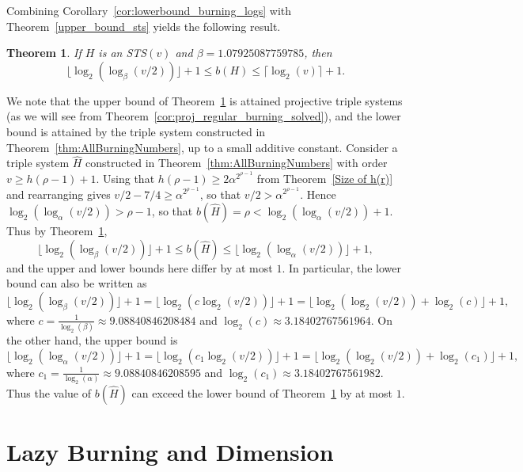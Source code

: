 \documentclass[12pt]{article}
\newtheorem{theorem}{Theorem}[section]
\theoremstyle{definition}
\numberwithin{table}{section}
\begin{document}
Combining Corollary~\ref{cor:lowerbound_burning_logs} with Theorem~\ref{upper_bound_sts} yields the following result. 

\begin{theorem}
\label{thm:ConfinedBurningNumber}
If $H$ is an STS$(v)$ and $\beta = 1.07925087759785$, then
\[\lfloor \log_2(\log_\beta(v/2))\rfloor +1\leq b(H)\leq   \lceil \log_2(v)\rceil+1.\]
\end{theorem}

We note that the upper bound of Theorem~\ref{thm:ConfinedBurningNumber} is attained projective triple systems (as we will see from Theorem~\ref{cor:proj_regular_burning_solved}), and the lower bound is attained by the triple system constructed in Theorem~\ref{thm:AllBurningNumbers}, up to a small additive constant. 
Consider a triple system $\widehat{H}$ constructed in Theorem~\ref{thm:AllBurningNumbers} with order $v \geq h(\rho-1)+1$.  Using that $h(\rho-1) \geq 2 \alpha^{2^{\rho-1}}$ from Theorem~\ref{Size of h(r)} and rearranging gives $v/2-7/4 \geq \alpha^{2^{\rho-1}}$, so that $v/2 > \alpha^{2^{\rho-1}}$.  Hence $\log_2(\log_{\alpha}(v/2)) > \rho-1$, so that $b(\widehat{H}) = \rho < \log_2(\log_{\alpha} (v/2)) + 1$.  Thus by Theorem~\ref{thm:ConfinedBurningNumber}, 
\[
\lfloor \log_2(\log_{\beta}(v/2))\rfloor+1 \leq b(\widehat{H}) \leq \lfloor\log_2(\log_{\alpha} (v/2))\rfloor + 1,
\]
and the upper and lower bounds here differ by at most $1$.
In particular, the lower bound can also be written as 
\[
\lfloor \log_2(\log_\beta(v/2))\rfloor +1 = \lfloor \log_2(c\log_2(v/2))\rfloor +1 = \lfloor \log_2(\log_2(v/2))+\log_2(c)\rfloor +1,
\]
where $c=\frac{1}{\log_2(\beta)} \approx 9.08840846208484$ and $\log_2(c) \approx 3.18402767561964$.
On the other hand, the upper bound is 
 \[
 \lfloor \log_2(\log_\alpha(v/2))\rfloor+1 = \lfloor \log_2(c_1\log_2(v/2))\rfloor+1 = \lfloor \log_2 (\log_2(v/2)) + \log_2(c_1)\rfloor+1,
 \]
 where $c_1= \frac{1}{\log_2(\alpha)} \approx 9.08840846208595$ and $\log_2(c_1) \approx 3.18402767561982$.
Thus the value of $b(\widehat{H})$ can exceed the lower bound of Theorem~\ref{thm:ConfinedBurningNumber} by at most $1$.

\section{Lazy Burning and Dimension}
\label{sec:LazyBurning}
\end{document}
